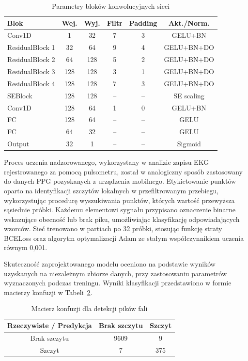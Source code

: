 \documentclass[journal]{IEEEtran}
\begin{document}
\begin{table}[ht]
\centering
\caption{Parametry bloków konwolucyjnych sieci}
\label{tab:ppg_layers}
\begin{tabular}{|l|c|c|c|c|c|}
\hline
\textbf{Blok} & \textbf{Wej.} & \textbf{Wyj.} & \textbf{Filtr} & \textbf{Padding} & \textbf{Akt./Norm.} \\
\hline
Conv1D & 1 & 32 & 7 & 3 & GELU+BN \\
ResidualBlock 1 & 32 & 64 & 9 & 4 & GELU+BN+DO \\
ResidualBlock 2 & 64 & 128 & 5 & 2 & GELU+BN+DO \\
ResidualBlock 3 & 128 & 128 & 3 & 1 & GELU+BN+DO\\
ResidualBlock 4 & 128 & 128 & 7 & 3 & GELU+BN+DO \\
SEBlock & 128 & 128 & – & – & SE scaling \\
Conv1D  & 128 & 64 & 1 & 0 & GELU+BN \\
FC & 128 & 64 & – & – & GELU \\
FC & 64 & 32 & – & – & GELU \\
Output & 32 & 1 & – & – & Sigmoid \\
\hline
\end{tabular}
\end{table}


Proces uczenia nadzorowanego, wykorzystany w analizie zapisu EKG rejestrowanego za pomocą pulsometru, został w analogiczny sposób zastosowany do danych PPG pozyskanych z urządzenia mobilnego. Etykietowanie punktów oparto na identyfikacji szczytów lokalnych w przefiltrowanym przebiegu, wykorzystując procedurę wyszukiwania punktów, których wartość przewyższa sąsiednie próbki. Każdemu elementowi sygnału przypisano oznaczenie binarne wskazujące obecność lub brak piku, umożliwiając klasyfikację odpowiadających wzorców. Sieć trenowano w partiach po 32 próbki, stosując funkcję straty BCELoss oraz algorytm optymalizacji Adam ze stałym współczynnikiem uczenia równym 0,001.

\newpage
Skuteczność zaprojektowanego modelu oceniono na podstawie wyników uzyskanych na niezależnym zbiorze danych, przy zastosowaniu parametrów wyznaczonych podczas treningu. Wyniki klasyfikacji przedstawiono w formie macierzy konfuzji w Tabeli~\ref{tab:conf_matrix_ppg}.

\begin{table}[ht]
\centering
\caption{Macierz konfuzji dla detekcji pików fali}
\label{tab:conf_matrix_ppg}
\begin{tabular}{|c|c|c|}
\hline
\textbf{Rzeczywiste / Predykcja} & \textbf{Brak szczytu } & \textbf{Szczyt} \\
\hline
Brak szczytu  & 9609 & 9 \\

Szczyt  & 7 & 375 \\
\hline
\end{tabular}
\end{table}
\end{document}
